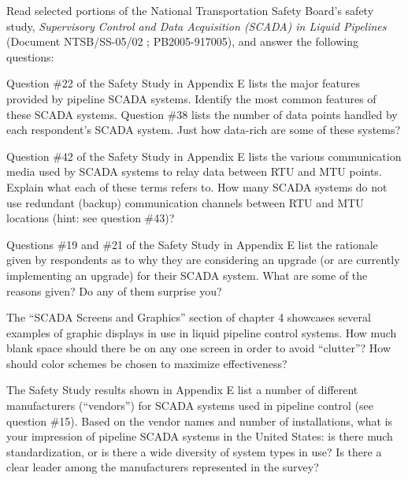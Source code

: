 

Read selected portions of the National Transportation Safety Board's safety study, {\it Supervisory Control and Data Acquisition (SCADA) in Liquid Pipelines} (Document NTSB/SS-05/02 ; PB2005-917005), and answer the following questions:

\vskip 10pt

Question \#22 of the Safety Study in Appendix E lists the major features provided by pipeline SCADA systems.  Identify the most common features of these SCADA systems.  Question \#38 lists the number of data points handled by each respondent's SCADA system.  Just how data-rich are some of these systems?  

\vskip 10pt

Question \#42 of the Safety Study in Appendix E lists the various communication media used by SCADA systems to relay data between RTU and MTU points.  Explain what each of these terms refers to.  How many SCADA systems do not use redundant (backup) communication channels between RTU and MTU locations (hint: see question \#43)?

\vskip 10pt

Questions \#19 and \#21 of the Safety Study in Appendix E list the rationale given by respondents as to why they are considering an upgrade (or are currently implementing an upgrade) for their SCADA system.  What are some of the reasons given?  Do any of them surprise you?

\vskip 10pt

The ``SCADA Screens and Graphics'' section of chapter 4 showcases several examples of graphic displays in use in liquid pipeline control systems.  How much blank space should there be on any one screen in order to avoid ``clutter''?  How should color schemes be chosen to maximize effectiveness?

\vskip 10pt

The Safety Study results shown in Appendix E list a number of different manufacturers (``vendors'') for SCADA systems used in pipeline control (see question \#15).  Based on the vendor names and number of installations, what is your impression of pipeline SCADA systems in the United States: is there much standardization, or is there a wide diversity of system types in use?  Is there a clear leader among the manufacturers represented in the survey?


